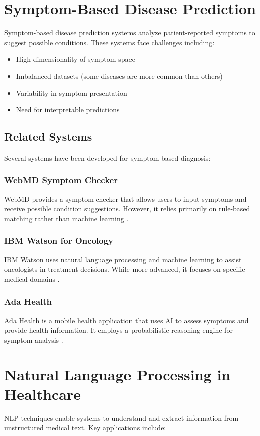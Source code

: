 \section{Symptom-Based Disease Prediction}
Symptom-based disease prediction systems analyze patient-reported symptoms to suggest possible conditions. These systems face challenges including:

\begin{itemize}
    \item High dimensionality of symptom space
    \item Imbalanced datasets (some diseases are more common than others)
    \item Variability in symptom presentation
    \item Need for interpretable predictions
\end{itemize}

\subsection{Related Systems}
Several systems have been developed for symptom-based diagnosis:

\subsubsection{WebMD Symptom Checker}
WebMD provides a symptom checker that allows users to input symptoms and receive possible condition suggestions. However, it relies primarily on rule-based matching rather than machine learning \cite{webmd}.

\subsubsection{IBM Watson for Oncology}
IBM Watson uses natural language processing and machine learning to assist oncologists in treatment decisions. While more advanced, it focuses on specific medical domains \cite{ibmwatson}.

\subsubsection{Ada Health}
Ada Health is a mobile health application that uses AI to assess symptoms and provide health information. It employs a probabilistic reasoning engine for symptom analysis \cite{adahealth}.

\section{Natural Language Processing in Healthcare}
NLP techniques enable systems to understand and extract information from unstructured medical text. Key applications include:

